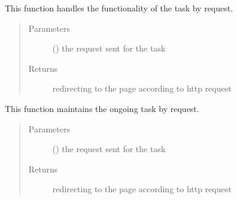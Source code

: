 \documentclass[letterpaper,10pt,english]{sphinxmanual}
\begin{document}
\begin{fulllineitems}
\label{\detokenize{janta:janta.views.my_tasks}}
This function handles the functionality of the task by request.
\begin{quote}\begin{description}
\item[{Parameters}] \leavevmode
{} () \textendash{} the request sent for the task

\item[{Returns}] \leavevmode
redirecting to the page according to http request

\end{description}\end{quote}

\end{fulllineitems}


\begin{fulllineitems}
\label{\detokenize{janta:janta.views.ongoing_tasks}}
This function maintains the ongoing task by request.
\begin{quote}\begin{description}
\item[{Parameters}] \leavevmode
{} () \textendash{} the request sent for the task

\item[{Returns}] \leavevmode
redirecting to the page according to http request

\end{description}\end{quote}

\end{fulllineitems}

\end{document}
